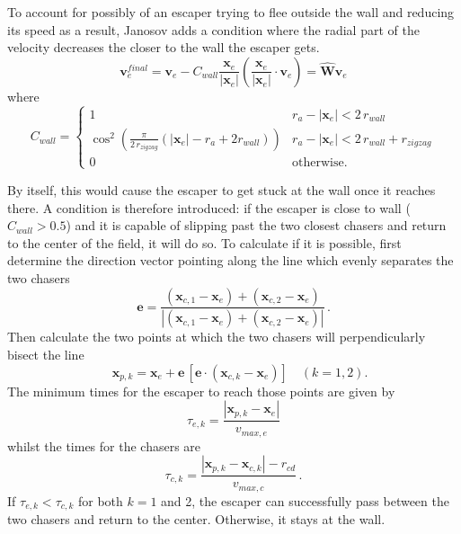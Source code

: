 \documentclass[%
11pt,
amsmath, amssymb,
aps,
pra
]{revtex4-2}
\begin{document}
To account for possibly of an escaper trying to flee outside the wall and reducing its speed as a result, Janosov adds  
a condition where the radial part of the velocity decreases the closer to the wall the escaper gets. 
\begin{equation}
    \mathbf{v}_e^{final} = \mathbf{v}_e - C_{wall} \frac{\mathbf{x}_e}{|\mathbf{x}_e|}
    \left(\frac{\mathbf{x}_e}{|\mathbf{x}_e|} \cdot \mathbf{v}_e \right) = \hat{\mathbf{W}}\mathbf{v}_e
\end{equation}
where
\begin{equation}
    C_{wall} = \begin{cases}
        1 & r_a - |\mathbf{x}_e| < 2 \, r_{wall} \\
        \cos^2\left(\frac{\pi}{2\,r_{zigzag}}(|\mathbf{x}_e| - r_a +2 r_{wall}) \right) & r_a - |\mathbf{x}_e| < 2\,r_{wall} + r_{zigzag} \\
        0 & \text{otherwise.}
    \end{cases}
\end{equation}

By itself, this would cause the escaper to get stuck at the wall once it reaches there. A condition is therefore introduced:
if the escaper is close to wall (\(C_{wall} > 0.5\)) and it is capable of slipping past the two closest chasers and return to the center
of the field, it will do so. To calculate if it is possible, first determine the direction vector pointing along the line 
which evenly separates the two chasers
\begin{equation}
    \mathbf{e} = \frac{(\mathbf{x}_{c, 1} - \mathbf{x}_{e}) + (\mathbf{x}_{c, 2} - \mathbf{x}_{e})}{|(\mathbf{x}_{c, 1} - \mathbf{x}_{e}) + (\mathbf{x}_{c, 2} - \mathbf{x}_{e})|}\,.
\end{equation}
Then calculate the two points at which the two chasers will perpendicularly bisect the line 
\begin{equation}
    \quad\mathbf{x}_{p, k} = \mathbf{x}_{e} + \mathbf{e} \, [\mathbf{e} \cdot (\mathbf{x}_{c, k} - \mathbf{x}_e)]\quad(k = 1,2).
\end{equation}
The minimum times for the escaper to reach those points are given by
\begin{equation}
    \tau_{e, k} = \frac{|\mathbf{x}_{p, k} - \mathbf{x}_e|}{v_{max, e}}
\end{equation}
whilst the times for the chasers are
\begin{equation}
    \tau_{c, k} = \frac{|\mathbf{x}_{p, k} - \mathbf{x}_{c, k}| - r_{cd}}{v_{max, c}}\,.
\end{equation}
If \(\tau_{e, k} < \tau_{c, k}\) for both \(k = 1 \) and 2, the escaper can successfully pass between the two chasers and 
return to the center. Otherwise, it stays at the wall.
\end{document}
